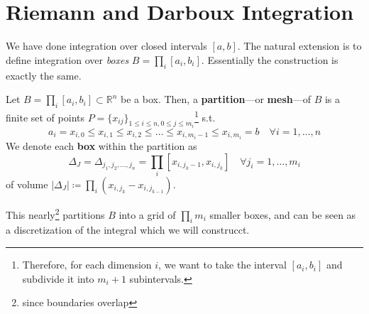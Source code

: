 \section{Riemann and Darboux Integration} 

  We have done integration over closed intervals $[a, b]$. The natural extension is to define integration over \textit{boxes} $B = \prod_i [a_i, b_i]$. Essentially the construction is exactly the same. 

  \begin{definition}
    Let $B = \prod_i [a_i, b_i] \subset \mathbb{R}^n$ be a box. Then, a \textbf{partition}---or \textbf{mesh}---of $B$ is a finite set of points $P = \{x_{ij}\}_{1 \leq i \leq n, 0 \leq j \leq m_i}$\footnote{Therefore, for each dimension $i$, we want to take the interval $[a_i, b_i]$ and subdivide it into $m_i+1$ subintervals.} s.t. 
    \begin{equation}
      a_i = x_{i, 0} \leq x_{i, 1} \leq x_{i, 2} \leq \ldots \leq x_{i, m_i-1} \leq x_{i, m_i} = b \quad \forall i = 1, \ldots, n
    \end{equation}
    We denote each \textbf{box} within the partition as 
    \begin{equation}
      \Delta_J = \Delta_{j_1, j_2, \ldots, j_n} = \prod_{i} [x_{i, j_k-1}, x_{i, j_k}] \quad \forall j_i = 1, \ldots, m_i
    \end{equation}
    of volume $|\Delta_J| \coloneqq \prod_{i} (x_{i, j_k} - x_{i, j_{k-1}})$. 
  \end{definition}

  This nearly\footnote{since boundaries overlap} partitions $B$ into a grid of $\prod_i m_i$ smaller boxes, and can be seen as a discretization of the integral which we will construcct. 

